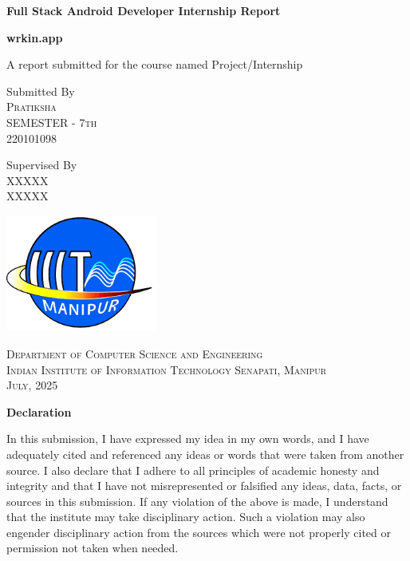 \documentclass[a4paper, 11pt, oneside]{report}
\begin{document}
\begin{titlepage}
  \centering
  \vspace*{\baselineskip}
  \vspace{0.75\baselineskip}
  {\Huge \bfseries Full Stack Android Developer Internship Report}
  \vspace{0.5\baselineskip}

  {\large \bfseries wrkin.app}
  \vspace{2\baselineskip}

  A report submitted for the course named Project/Internship
  \vspace*{7\baselineskip}

  Submitted By\\
  {\scshape\Large Pratiksha\\ SEMESTER - 7th \\ 220101098}
  \vspace{1\baselineskip}

  Supervised By\\
  {\scshape\Large XXXXX}\\
  {\small XXXXX}

  \vfill

  \begin{center}
    \includegraphics[width=5cm]{report_file/iiit manipur.png}
  \end{center}

  {\scshape\small Department of Computer Science and Engineering\\ Indian Institute of Information Technology Senapati, Manipur \\ July, 2025}
\end{titlepage}

\begin{center}
  {\LARGE \textbf{Declaration}}
\end{center}
In this submission, I have expressed my idea in my own words, and I have adequately cited and referenced any ideas or words that were taken from another source. I also declare that I adhere to all principles of academic honesty and integrity and that I have not misrepresented or falsified any ideas, data, facts, or sources in this submission. If any violation of the above is made, I understand that the institute may take disciplinary action. Such a violation may also engender disciplinary action from the sources which were not properly cited or permission not taken when needed.
\end{document}
